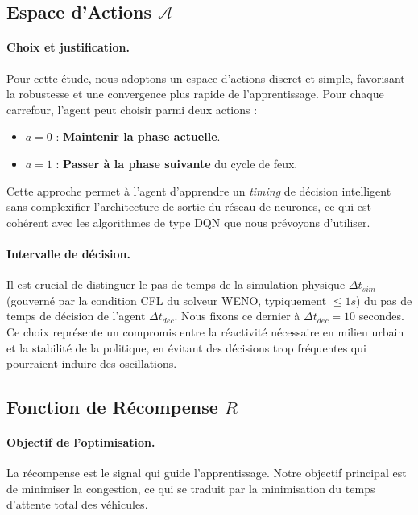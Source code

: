\subsection{Espace d'Actions $\mathcal{A}$}
\label{subsec:espace_actions}

\paragraph{Choix et justification.} Pour cette étude, nous adoptons un espace d'actions discret et simple, favorisant la robustesse et une convergence plus rapide de l'apprentissage. Pour chaque carrefour, l'agent peut choisir parmi deux actions :
\begin{itemize}
    \item $a=0$ : \textbf{Maintenir la phase actuelle}.
    \item $a=1$ : \textbf{Passer à la phase suivante} du cycle de feux.
\end{itemize}
Cette approche permet à l'agent d'apprendre un \textit{timing} de décision intelligent sans complexifier l'architecture de sortie du réseau de neurones, ce qui est cohérent avec les algorithmes de type DQN que nous prévoyons d'utiliser.

\paragraph{Intervalle de décision.} Il est crucial de distinguer le pas de temps de la simulation physique $\Delta t_{sim}$ (gouverné par la condition CFL du solveur WENO, typiquement $\leq 1s$) du pas de temps de décision de l'agent $\Delta t_{dec}$. Nous fixons ce dernier à $\Delta t_{dec}=10$ secondes. Ce choix représente un compromis entre la réactivité nécessaire en milieu urbain et la stabilité de la politique, en évitant des décisions trop fréquentes qui pourraient induire des oscillations.

\subsection{Fonction de Récompense $R$}
\label{subsec:fonction_recompense}

\paragraph{Objectif de l'optimisation.} La récompense est le signal qui guide l'apprentissage. Notre objectif principal est de minimiser la congestion, ce qui se traduit par la minimisation du temps d'attente total des véhicules.

